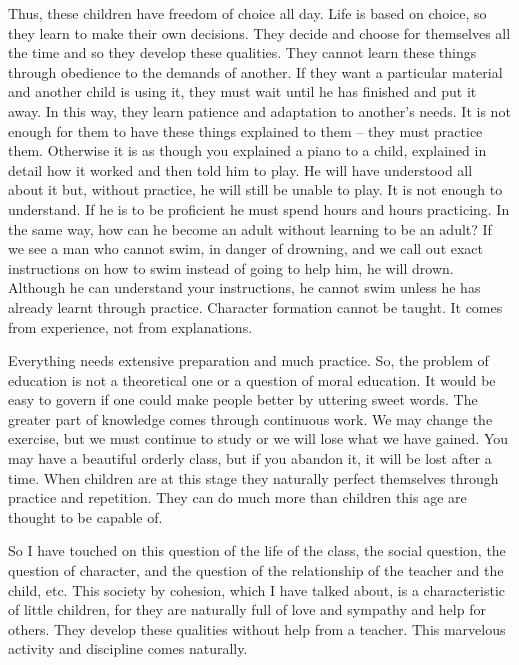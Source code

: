 \documentclass[lang=cn,10pt]{elegantbook}
\begin{document}
Thus, these children have freedom of choice all day. Life is based on choice, so they learn to make their own decisions. They decide and choose for themselves all the time and so they develop these qualities. They cannot learn these things through obedience to the demands of another. If they want a particular material and another child is using it, they must wait until he has finished and put it away. In this way, they learn patience and adaptation to another’s needs. It is not enough for them to have these things explained to them – they must practice them. Otherwise it is as though you explained a piano to a child, explained in detail how it worked and then told him to play. He will have understood all about it but, without practice, he will still be unable to play. It is not enough to understand. If he is to be proficient he must spend hours and hours practicing. In the same way, how can he become an adult without learning to be an adult? If we see a man who cannot swim, in danger of drowning, and we call out exact instructions on how to swim instead of going to
help him, he will drown. Although he can understand your instructions, he cannot swim unless he has already learnt through practice. Character formation cannot be taught. It comes from experience, not from explanations.

Everything needs extensive preparation and much practice. So, the problem of education is not a theoretical one or a question of moral education. It would be easy to govern if one could make people better by uttering sweet words. The greater part of knowledge comes through continuous work. We may change the exercise, but we must continue to study or we will lose what we have gained. You may have a beautiful orderly class, but if you abandon it, it will be lost after a time. When children are at this stage they naturally perfect themselves through practice and repetition. They can do much more than children this age are thought to be capable of.

So I have touched on this question of the life of the class, the social question, the question of character, and the question of the relationship of the teacher and the child, etc. This society by cohesion, which I have talked about, is a characteristic of little children, for they are naturally full of love and sympathy and help for others. They develop these qualities without help from a teacher. This marvelous activity and discipline comes naturally.
\end{document}
